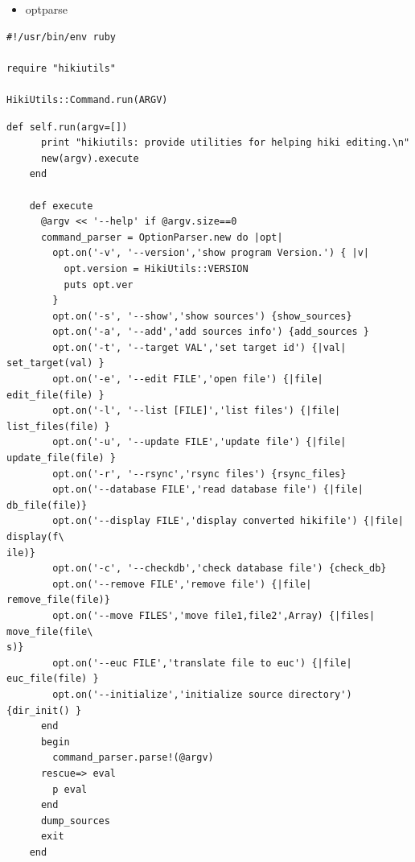\begin{itemize}
\item optparse
\end{itemize}\begin{lstlisting}[style=customRuby]
#!/usr/bin/env ruby                                                             

require "hikiutils"

HikiUtils::Command.run(ARGV)
\end{lstlisting}\begin{lstlisting}[style=customRuby]
    def self.run(argv=[])
      print "hikiutils: provide utilities for helping hiki editing.\n"
      new(argv).execute
    end

    def execute
      @argv << '--help' if @argv.size==0
      command_parser = OptionParser.new do |opt|
        opt.on('-v', '--version','show program Version.') { |v|
          opt.version = HikiUtils::VERSION
          puts opt.ver
        }
        opt.on('-s', '--show','show sources') {show_sources}
        opt.on('-a', '--add','add sources info') {add_sources }
        opt.on('-t', '--target VAL','set target id') {|val| set_target(val) }
        opt.on('-e', '--edit FILE','open file') {|file| edit_file(file) }
        opt.on('-l', '--list [FILE]','list files') {|file| list_files(file) }
        opt.on('-u', '--update FILE','update file') {|file| update_file(file) }
        opt.on('-r', '--rsync','rsync files') {rsync_files}
        opt.on('--database FILE','read database file') {|file| db_file(file)}
        opt.on('--display FILE','display converted hikifile') {|file| display(f\
ile)}
        opt.on('-c', '--checkdb','check database file') {check_db}
        opt.on('--remove FILE','remove file') {|file| remove_file(file)}
        opt.on('--move FILES','move file1,file2',Array) {|files| move_file(file\
s)}
        opt.on('--euc FILE','translate file to euc') {|file| euc_file(file) }
        opt.on('--initialize','initialize source directory') {dir_init() }
      end
      begin
        command_parser.parse!(@argv)
      rescue=> eval
        p eval
      end
      dump_sources
      exit
    end  
\end{lstlisting}
